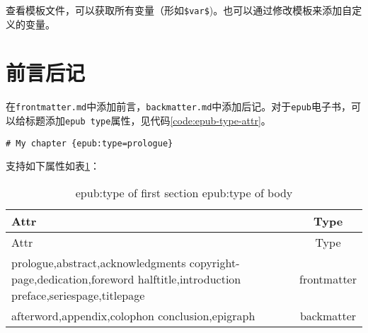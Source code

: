 \documentclass[cn]{elegantbook}
\newcommand{\passthrough}[1]{#1}
\begin{document}
查看模板文件，可以获取所有变量（形如\passthrough{\lstinline!$var$!})。也可以通过修改模板来添加自定义的变量。

\hypertarget{ux524dux8a00ux540eux8bb0}{%
\section{前言后记}\label{ux524dux8a00ux540eux8bb0}}

在\passthrough{\lstinline!frontmatter.md!}中添加前言，\passthrough{\lstinline!backmatter.md!}中添加后记。对于\passthrough{\lstinline!epub!}电子书，可以给标题添加\passthrough{\lstinline!epub type!}属性，见代码\ref{code:epub-type-attr}。

\begin{lstlisting}[label=code:epub-type-attr, caption=code:epub-type-attr, float=htbp]
# My chapter {epub:type=prologue}
\end{lstlisting}

支持如下属性如表\ref{table:epub-type-attr}：

\begin{longtable}[]{@{}lc@{}}
\caption{epub:type of first section epub:type of
body\label{table:epub-type-attr}}\tabularnewline
\toprule
\begin{minipage}[b]{0.51\columnwidth}\raggedright
Attr\strut
\end{minipage} & \begin{minipage}[b]{0.16\columnwidth}\centering
Type\strut
\end{minipage}\tabularnewline
\midrule
\endfirsthead
\toprule
\begin{minipage}[b]{0.51\columnwidth}\raggedright
Attr\strut
\end{minipage} & \begin{minipage}[b]{0.16\columnwidth}\centering
Type\strut
\end{minipage}\tabularnewline
\midrule
\endhead
\begin{minipage}[t]{0.51\columnwidth}\raggedright
prologue,abstract,acknowledgments copyright-page,dedication,foreword
halftitle,introduction preface,seriespage,titlepage\strut
\end{minipage} & \begin{minipage}[t]{0.16\columnwidth}\centering
frontmatter\strut
\end{minipage}\tabularnewline
\begin{minipage}[t]{0.51\columnwidth}\raggedright
afterword,appendix,colophon conclusion,epigraph\strut
\end{minipage} & \begin{minipage}[t]{0.16\columnwidth}\centering
backmatter\strut
\end{minipage}\tabularnewline
\bottomrule
\end{longtable}
\end{document}
